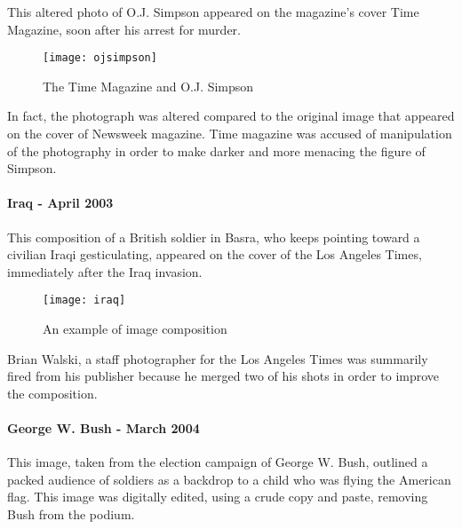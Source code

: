 This altered photo of O.J. Simpson appeared on the magazine's cover Time Magazine, soon after his arrest for murder. 

\begin{wrapfigure}{r}{0.45\textwidth}
\vspace{-1cm}
  \begin{center}
    \texttt{[image: ojsimpson]}
  \end{center}
  \caption{The Time Magazine and O.J. Simpson}
  \vspace{1.5cm}
\end{wrapfigure}

In fact, the photograph was altered compared to the original image that appeared on the cover of Newsweek magazine. Time magazine was accused of manipulation of the photography in order to make darker and more menacing the figure of Simpson.

\paragraph{Iraq - April 2003}

This composition of a British soldier in Basra, who keeps pointing toward a civilian Iraqi gesticulating, appeared on the cover of the Los Angeles Times, immediately after the Iraq invasion. 

\begin{wrapfigure}{l}{0.45\textwidth}
\vspace{-1cm}
  \begin{center}
    \texttt{[image: iraq]}
  \end{center}
  \caption{An example of image composition}
  \vspace{-0.5cm}
\end{wrapfigure}

Brian Walski, a staff photographer for the Los Angeles Times was summarily fired from his publisher because he merged two of his shots in order to improve the composition.

\paragraph{George W. Bush - March 2004}

This image, taken from the election campaign of George W. Bush, outlined a packed audience of soldiers as a backdrop to a child who was flying the American flag. This image was digitally edited, using a crude copy and paste, removing Bush from the podium. 

